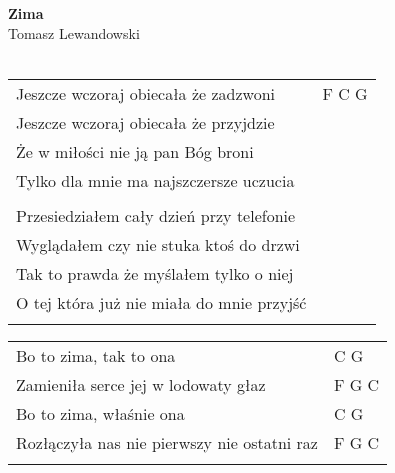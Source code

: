 \documentclass[a5paper]{article}
\begin{document}


\noindent
\fontsize{12pt}{15pt}\selectfont
\textbf{Zima} \\
\fontsize{8pt}{10pt}\selectfont
Tomasz Lewandowski \\ \\
\fontsize{10pt}{12pt}\selectfont
{}
\begin{tabular}{@{}p{8.00cm}p{3cm}@{}}
\noindent
Jeszcze wczoraj obiecała że zadzwoni & F C G \\
Jeszcze wczoraj obiecała że przyjdzie \\
Że w miłości nie ją pan Bóg broni \\
Tylko dla mnie ma najszczersze uczucia \\ \\

Przesiedziałem cały dzień przy telefonie \\
Wyglądałem czy nie stuka ktoś do drzwi \\
Tak to prawda że myślałem tylko o niej \\
O tej która już nie miała do mnie przyjść \\ \\
\end{tabular}

\noindent
\begin{tabular}{@{}p{7.00cm}p{3cm}@{}}
Bo to zima, tak to ona & C G \\
Zamieniła serce jej w lodowaty głaz & F G C \\
Bo to zima, właśnie ona & C G \\
Rozłączyła nas nie pierwszy nie ostatni raz & F G C \\ \\
\end{tabular}
\end{document}
